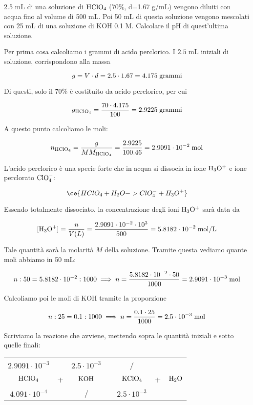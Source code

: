 \begin{esercizio}
    2.5 mL di una soluzione di $\rm HClO_4$ (70\%, d=1.67 g/mL) vengono diluiti con acqua fino al volume di 500 mL. Poi 50 mL di questa soluzione vengono mescolati con 25 mL di una soluzione di KOH 0.1 M. Calcolare il pH di quest'ultima soluzione.
\end{esercizio}
\begin{soluzione}
    Per prima cosa calcoliamo i grammi di acido perclorico. I $2.5$ mL iniziali di soluzione, corrispondono alla massa

$$g=V \cdot d=2.5 \cdot 1.67=4.175 \; \rm grammi$$

Di questi, solo il 70\% è costituito da acido perclorico, per cui

$$g_{\rm HClO_4}=\frac{70 \cdot 4.175}{100}=2.9225 \; \rm grammi$$

A questo punto calcoliamo le moli:

$$n_{\rm HClO_4}
=\frac{g}{MM_{\rm HClO_4}}
=\frac{2.9225}{100.46}=2.9091 \cdot 10^{-2} \; \rm mol$$

L'acido perclorico è una specie forte che in acqua si dissocia in ione $\rm H_3O^+$ e ione perclorato $\rm ClO_4^-$:

$$\ce{HClO_4 + H_2O -> ClO_4^- + H_3O^+}$$

Essendo totalmente dissociato, la concentrazione degli ioni $\rm H_3O^+$ sarà data da

$$[\text{H}_3\text{O}^+]=\frac{n}{V(L)}=\frac{2.9091 \cdot 10^{-2} \cdot 10^{3}}{500}=5.8182 \cdot 10^{-2} \; \rm mol/L$$

Tale quantità sarà la molarità $M$ della soluzione. Tramite questa vediamo quante moli abbiamo in 50 mL:

$$n:50=5.8182 \cdot 10^{-2}:1000
\implies
n=\frac{5.8182 \cdot 10^{-2} \cdot 50}{1000}
=2.9091 \cdot 10^{-3} \; \rm mol$$

Calcoliamo poi le moli di KOH tramite la proporzione

$$n:25=0.1:1000
\implies
n=\frac{0.1 \cdot 25}{1000}
=2.5 \cdot 10^{-3} \; \rm mol$$

Scriviamo la reazione che avviene, mettendo sopra le quantità iniziali e sotto quelle finali:

\begin{center}
    \begin{tabular}{ccccccc}
        $2.9091 \cdot 10^{-3}$ &  & $2.5 \cdot 10^{-3}$ & & / &&\\
        $\rm HClO_4$ & + & $\rm KOH$ & \ce{->} & $\rm KClO_4$ & + & $\rm H_2O$\\
        $4.091 \cdot 10^{-4}$ &  & / & & $2.5 \cdot 10^{-3}$ &&\\
    \end{tabular}
\end{center}


\end{soluzione}
